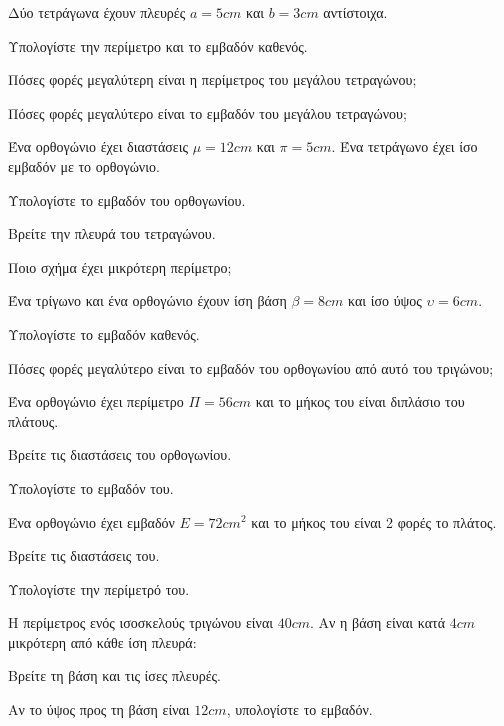 \documentclass[11pt,a4paper,modern]{FFExercises}
\begin{document}
\askhsh Δύο τετράγωνα έχουν πλευρές $a=5\si{cm}$ και $b=3\si{cm}$ αντίστοιχα.
\begin{alist}
\item Υπολογίστε την περίμετρο και το εμβαδόν καθενός.
\item Πόσες φορές μεγαλύτερη είναι η περίμετρος του μεγάλου τετραγώνου;
\item Πόσες φορές μεγαλύτερο είναι το εμβαδόν του μεγάλου τετραγώνου;
\end{alist}

\askhsh Ένα ορθογώνιο έχει διαστάσεις $\mu=12\si{cm}$ και $\pi=5\si{cm}$. Ένα τετράγωνο έχει ίσο εμβαδόν με το ορθογώνιο.
\begin{alist}
\item Υπολογίστε το εμβαδόν του ορθογωνίου.
\item Βρείτε την πλευρά του τετραγώνου.
\item Ποιο σχήμα έχει μικρότερη περίμετρο;
\end{alist}

\askhsh Ένα τρίγωνο και ένα ορθογώνιο έχουν ίση βάση $\beta=8\si{cm}$ και ίσο ύψος $\upsilon=6\si{cm}$.
\begin{alist}
\item Υπολογίστε το εμβαδόν καθενός.
\item Πόσες φορές μεγαλύτερο είναι το εμβαδόν του ορθογωνίου από αυτό του τριγώνου;
\end{alist}

\askhsh Ένα ορθογώνιο έχει περίμετρο $\Pi=56\si{cm}$ και το μήκος του είναι διπλάσιο του πλάτους.
\begin{alist}
\item Βρείτε τις διαστάσεις του ορθογωνίου.
\item Υπολογίστε το εμβαδόν του.
\end{alist}

\askhsh Ένα ορθογώνιο έχει εμβαδόν $E=72\si{cm^2}$ και το μήκος του είναι 2 φορές το πλάτος.
\begin{alist}
\item Βρείτε τις διαστάσεις του.
\item Υπολογίστε την περίμετρό του.
\end{alist}

\askhsh Η περίμετρος ενός ισοσκελούς τριγώνου είναι $40\si{cm}$. Αν η βάση είναι κατά $4\si{cm}$ μικρότερη από κάθε ίση πλευρά:
\begin{alist}
\item Βρείτε τη βάση και τις ίσες πλευρές.
\item Αν το ύψος προς τη βάση είναι $12\si{cm}$, υπολογίστε το εμβαδόν.
\end{alist}
\end{document}
